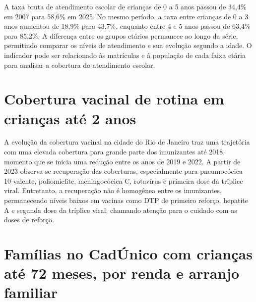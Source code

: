 
A taxa bruta de atendimento escolar de crianças de 0 a 5 anos passou de 34,4\% em 2007 para 58,6\% em 2025. No mesmo período, a taxa entre crianças de 0 a 3 anos aumentou de 18,9\% para 43,7\%, enquanto entre 4 e 5 anos passou de 63,4\% para 85,2\%. A diferença entre os grupos etários permanece ao longo da série, permitindo comparar os níveis de atendimento e sua evolução segundo a idade. O indicador pode ser relacionado às matrículas e à população de cada faixa etária para analisar a cobertura do atendimento escolar.


\section{Cobertura vacinal de rotina em crianças até 2 anos}


A evolução da cobertura vacinal na cidade do Rio de Janeiro traz uma trajetória com uma elevada cobertura para grande parte dos imunizantes até 2018, momento que se inicia uma redução entre os anos de 2019 e 2022. A partir de 2023 observa-se recuperação das coberturas, especialmente para pneumocócica 10-valente, poliomielite, meningocócica C, rotavírus e primeira dose da tríplice viral. Entretanto, a recuperação não é homogênea entre os imunizantes, permanecendo níveis baixos em vacinas como DTP de primeiro reforço, hepatite A e segunda dose da tríplice viral, chamando atenção para o cuidado com as doses de reforço.


\section{Famílias no CadÚnico com crianças até 72 meses, por renda e arranjo familiar}


